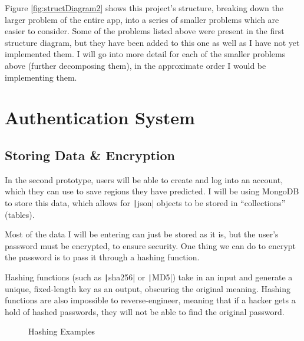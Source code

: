 \documentclass[12pt]{report}
\newcommand{\pil}[1]{\protect\texttt|#1|}
\begin{document}
Figure \ref{fig:structDiagram2} shows this project's structure, breaking down the larger problem of the entire app, into a series of smaller problems which are easier to consider. Some of the problems listed above were present in the first structure diagram, but they have been added to this one as well as I have not yet implemented them. I will go into more detail for each of the smaller problems above (further decomposing them), in the approximate order I would be implementing them.

\section{Authentication System}\label{sec:authenticationSystem}
\subsection{Storing Data \& Encryption}\label{sec:encryption}
In the second prototype, users will be able to create and log into an account, which they can use to save regions they have predicted. I will be using MongoDB to store this data, which allows for \pil{json} objects to be stored in ``collections'' (tables).

Most of the data I will be entering can just be stored as it is, but the user's password must be encrypted, to ensure security. One thing we can do to encrypt the password is to pass it through a hashing function.

Hashing functions (such as \pil{sha256} or \pil{MD5}) take in an input and generate a unique, fixed-length key as an output, obscuring the original meaning. Hashing functions are also impossible to reverse-engineer, meaning that if a hacker gets a hold of hashed passwords, they will not be able to find the original password.

\begin{figure}[H]
\centering
{}
\caption{Hashing Examples}
\end{figure}
\end{document}
